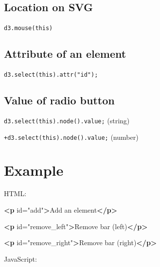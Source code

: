 \documentclass[openany]{book}
\newenvironment{Shaded}{\begin{snugshade}}{\end{snugshade}}
\newcommand{\KeywordTok}[1]{\textcolor[rgb]{0.13,0.29,0.53}{\textbf{#1}}}
\newcommand{\NormalTok}[1]{#1}
\newcommand{\OtherTok}[1]{\textcolor[rgb]{0.56,0.35,0.01}{#1}}
\newcommand{\StringTok}[1]{\textcolor[rgb]{0.31,0.60,0.02}{#1}}
\begin{document}
\hypertarget{location-on-svg}{%
\subsection{Location on SVG}\label{location-on-svg}}

\texttt{d3.mouse(this)}

\hypertarget{attribute-of-an-element}{%
\subsection{Attribute of an element}\label{attribute-of-an-element}}

\texttt{d3.select(this).attr("id");}

\hypertarget{value-of-radio-button}{%
\subsection{Value of radio button}\label{value-of-radio-button}}

\texttt{d3.select(this).node().value;} (string)

\texttt{+d3.select(this).node().value;} (number)

\hypertarget{example-2}{%
\section{Example}\label{example-2}}

HTML:

\begin{Shaded}
\begin{Highlighting}[]
\KeywordTok{<p}\OtherTok{ id=}\StringTok{"add"}\KeywordTok{>}\NormalTok{Add an element}\KeywordTok{</p>}

\KeywordTok{<p}\OtherTok{ id=}\StringTok{"remove_left"}\KeywordTok{>}\NormalTok{Remove bar (left)}\KeywordTok{</p>}

\KeywordTok{<p}\OtherTok{ id=}\StringTok{"remove_right"}\KeywordTok{>}\NormalTok{Remove bar (right)}\KeywordTok{</p>}
\end{Highlighting}
\end{Shaded}

JavaScript:
\end{document}
